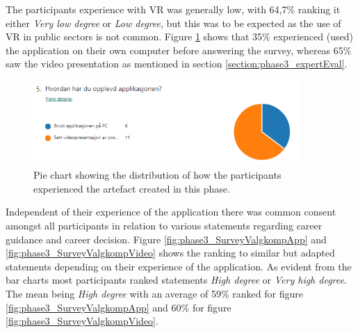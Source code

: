 The participants experience with VR was generally low, with 64,7\% ranking it either \textit{Very low degree} or \textit{Low degree}, but this was to be expected as the use of VR in public sectors is not common. Figure \ref{fig:phase3_SurveyUseApp} shows that 35\% experienced (used) the application on their own computer before answering the survey, whereas 65\% saw the video presentation as mentioned in section \ref{section:phase3_expertEval}.  



\begin{figure}[H]
  \centering
   \captionsetup{width=.8\linewidth}
    \includegraphics[width=0.9\textwidth]{fig/phase_3/survey/useOfApp.PNG}
 \caption{Pie chart showing the distribution of how the participants experienced the artefact created in this phase.}
\label{fig:phase3_SurveyUseApp}
\end{figure}

Independent of their experience of the application there was common consent amongst all participants in relation to various statements regarding career guidance and career decision. Figure \ref{fig:phase3_SurveyValgkompApp} and \ref{fig:phase3_SurveyValgkompVideo} shows the ranking to similar but adapted statements depending on their experience of the application. As evident from the bar charts most participants ranked statements \textit{High degree} or \textit{Very high degree}. The mean being \textit{High degree} with an average of 59\% ranked for figure \ref{fig:phase3_SurveyValgkompApp} and 60\% for figure \ref{fig:phase3_SurveyValgkompVideo}.

